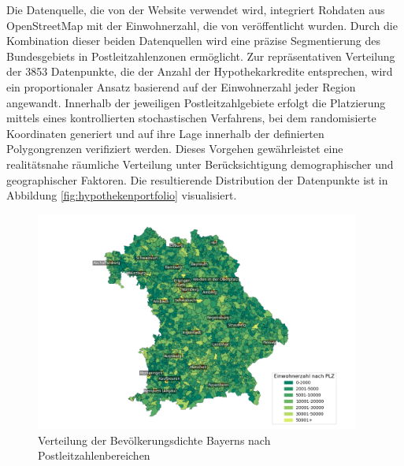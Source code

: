 Die Datenquelle, die von der Website \textcite{suche_postleitzahl} verwendet wird, integriert Rohdaten aus OpenStreetMap mit der Einwohnerzahl, die von \textcite{destatis} veröffentlicht wurden. Durch die Kombination dieser beiden Datenquellen wird eine präzise Segmentierung des Bundesgebiets in Postleitzahlenzonen ermöglicht.
Zur repräsentativen Verteilung der 3853 Datenpunkte, die der Anzahl der Hypothekarkredite entsprechen, wird ein proportionaler Ansatz basierend auf der Einwohnerzahl jeder Region angewandt. Innerhalb der jeweiligen Postleitzahlgebiete erfolgt die Platzierung mittels eines kontrollierten stochastischen Verfahrens, bei dem randomisierte Koordinaten generiert und auf ihre Lage innerhalb der definierten Polygongrenzen verifiziert werden. Dieses Vorgehen gewährleistet eine realitätsnahe räumliche Verteilung unter Berücksichtigung demographischer und geographischer Faktoren. Die resultierende Distribution der Datenpunkte ist in Abbildung \ref{fig:hypothekenportfolio} visualisiert.
\begin{figure}[htbp]
    \centering
    \includegraphics[width=0.95\textwidth]{figures/Bayern_pop_plz.png}
    \caption{Verteilung der Bevölkerungsdichte Bayerns nach Postleitzahlenbereichen}
    \label{fig:bevoelkerungsdichte}
\end{figure}

